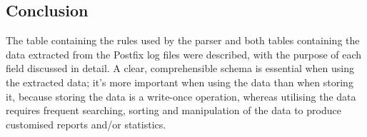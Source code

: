 \subsection{Conclusion}

The table containing the rules used by the parser and both tables
containing the data extracted from the Postfix log files were described,
with the purpose of each field discussed in detail.  A clear,
comprehensible schema is essential when using the extracted data; it's more
important when using the data than when storing it, because storing the
data is a write-once operation, whereas utilising the data requires
frequent searching, sorting and manipulation of the data to produce
customised reports and/or statistics.

